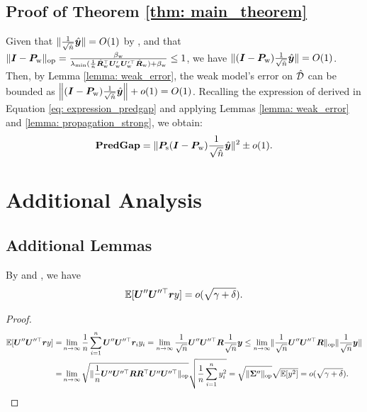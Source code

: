 \subsection{Proof of Theorem \ref{thm: main_theorem}} \label{apdx: proof_main_theorem}
Given that $\| \frac{1}{\sqrt{\hat{n}}}\hat{{\bm{y}}} \|=O(1)$ by \bounded, and that 
$\lVert {\bm{I}} -{\bm{P}}_{\text{w}}   \rVert_{\mathrm{op}} = \frac{ \beta_{\text{w}} }{ \lambda_{\min}( \frac{1}{\hat{n}}\hat{{\bm{R}}}_{\text{w}}^\top {\bm{U}}_{\text{w}}'{\bm{U}}_{\text{w}}'^\top \hat{{\bm{R}}}_{\text{w}}  ) +\beta_{\text{w}} } \leq 1 $, we have $\|({\bm{I}} -{\bm{P}}_{\text{w}})\frac{1}{\sqrt{\hat{n}}}\hat{{\bm{y}}}\|=O(1) $. Then, by Lemma \ref{lemma: weak_error}, the weak model's error on $\hat{{\mathcal{D}}}$ can be bounded  as $\left\| 
 ({\bm{I}} -{\bm{P}}_{\text{w}} )\frac{1}{\sqrt{\hat{n}}}\hat{{\bm{y}}} \right\|+o(1)=O(1)$. Recalling the expression of \predgap{} derived in Equation \ref{eq: expression_predgap} and applying Lemmas \ref{lemma: weak_error} and \ref{lemma: propagation_strong}, we obtain:
\begin{align}
    \nonumber
    \predgap = \| \mP_\s (\mI -\mP_\w ) \frac{1}{\sqrt{\hat{n}}} \hat{\vy}  \|^2 \pm o(1). %
\end{align}

\section{Additional Analysis}

\subsection{Additional Lemmas}

\begin{lemma}\label{lemma: bound_ery_non_principal}
By \dimini{} and \bounded{}, we have
\begin{align}
    \nonumber
    \mathbb{E}[ {\bm{U}}'' {\bm{U}}''^\top {\bm{r}} y ]=o(\sqrt{\gamma+\delta}).
\end{align}
\begin{proof}
    \begin{align}
        \nonumber
        \mathbb{E}[ {\bm{U}}'' {\bm{U}}''^\top {\bm{r}} y ] =& \lim_{n\rightarrow \infty} \frac{1}{n}\sum_{i=1}^n  {\bm{U}}'' {\bm{U}}''^\top {\bm{r}}_i y_i =\lim_{n\rightarrow \infty} \frac{1}{\sqrt{n}}{\bm{U}}''{\bm{U}}''^\top {\bm{R}}\frac{1}{\sqrt{n}}{\bm{y}}  \leq  \lim_{n\rightarrow \infty} \lVert \frac{1}{\sqrt{n}}{\bm{U}}''{\bm{U}}''^\top {\bm{R}}  \rVert_{\mathrm{op}} \|\frac{1}{\sqrt{n}}{\bm{y}} \|\\
        \nonumber
        = & \lim_{n\rightarrow \infty} \sqrt{\lVert \frac{1}{n}{\bm{U}}''{\bm{U}}''^\top {\bm{R}}{\bm{R}}^\top{\bm{U}}''{\bm{U}}''^\top  \rVert_{\mathrm{op}}} \sqrt{\frac{1}{n}\sum_{i=1}^n y_i^2} =\sqrt{\lVert  {\bm{\Sigma}}''  \rVert_{\mathrm{op}}} \sqrt{\mathbb{E}[y^2]} = o(\sqrt{\gamma+\delta}).
    \end{align}
\end{proof}
\end{lemma}

